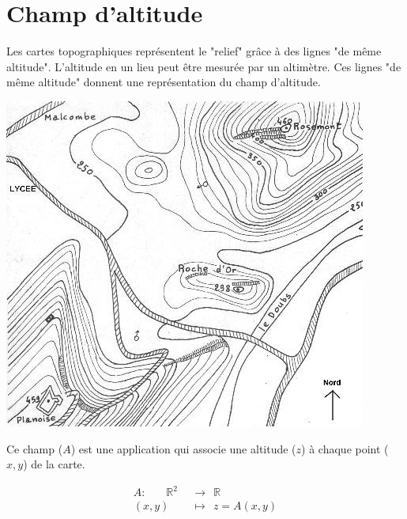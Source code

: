 
\section{Champ d'altitude}
%
Les cartes topographiques représentent le "relief" grâce à des lignes "de même altitude". L'altitude en un lieu peut être mesurée par un altimètre.
Ces lignes "de même altitude" donnent une représentation du champ d'altitude.

\begin{center}
\includegraphics[scale=5]{./champs/topographique}
\end{center}

Ce champ ($A$) est une application qui associe une altitude ($z$) à chaque point ($x,y$) de la carte.

\begin{align*}
A :\ \ \ \ \ \ \ \ \mathbb{R} ^2 \ \  & \rightarrow \ \ \mathbb{R} \\
(x,y) \ \ & \mapsto \ \ z = A(x,y)
\end{align*}



